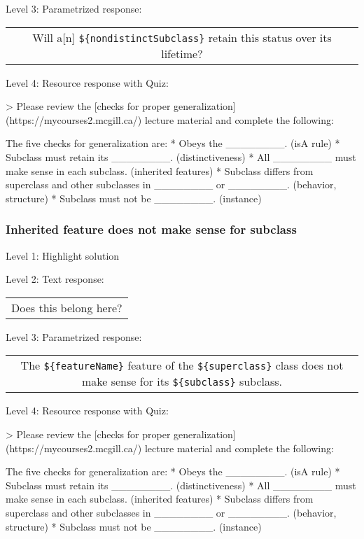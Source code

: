\noindent Level 3: Parametrized response: \medskip

\begin{tabular}{|c}
Will a[n] \verb|${nondistinctSubclass}| retain this status over its lifetime?
\end{tabular} \medskip

\noindent Level 4: Resource response with Quiz:

> Please review the [checks for proper generalization](https://mycourses2.mcgill.ca/) lecture material
and complete the following:

The five checks for generalization are:
* Obeys the ________. (isA rule)
* Subclass must retain its ________. (distinctiveness)
* All ________ must make sense in each subclass. (inherited features)
* Subclass differs from superclass and other subclasses in ________ or ________. 
(behavior, structure)
* Subclass must not be ________. (instance)


\subsubsection{Inherited feature does not make sense for subclass}

\noindent Level 1: Highlight solution \medskip

\noindent Level 2: Text response: \medskip

\begin{tabular}{|c}
Does this belong here?
\end{tabular} \medskip

\noindent Level 3: Parametrized response: \medskip

\begin{tabular}{|c}
The \verb|${featureName}| feature of the \verb|${superclass}| class does not make sense for its \verb|${subclass}| subclass.
\end{tabular} \medskip

\noindent Level 4: Resource response with Quiz:

> Please review the [checks for proper generalization](https://mycourses2.mcgill.ca/) lecture material
and complete the following:

The five checks for generalization are:
* Obeys the ________. (isA rule)
* Subclass must retain its ________. (distinctiveness)
* All ________ must make sense in each subclass. (inherited features)
* Subclass differs from superclass and other subclasses in ________ or ________. 
(behavior, structure)
* Subclass must not be ________. (instance)


